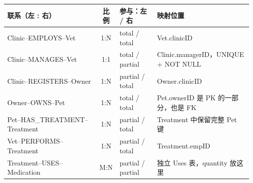 \documentclass[11pt,a4paper]{article}
\begin{document}
{\small\begin{tabularx}{\linewidth}{@{}lclX@{}}
\toprule 联系（左 : 右） & 比例 & 参与：左 / 右 & 映射位置 \\
\midrule
Clinic--EMPLOYS--Vet & 1:N & total / total & Vet.clinicID\\
Clinic--MANAGES--Vet & 1:1 & total / partial & Clinic.managerID，UNIQUE + NOT NULL\\
Clinic--REGISTERS--Owner & 1:N & partial / total & Owner.clinicID\\
Owner--OWNS--Pet & 1:N & total / total & Pet.ownerID 是 PK 的一部分，也是 FK\\
Pet--HAS\_TREATMENT--Treatment & 1:N & partial / total & Treatment 中保留完整 Pet 键\\
Vet--PERFORMS--Treatment & 1:N & partial / total & Treatment.empID\\
Treatment--USES--Medication & M:N & partial / partial & 独立 Uses 表，quantity 放这里\\
\bottomrule
\end{tabularx}}
\end{document}

